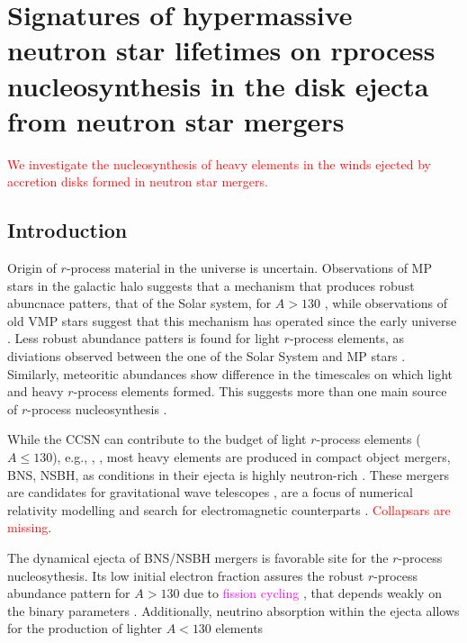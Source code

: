 \documentclass[11pt,a4paper,headinclude=true,DIV=14,BCOR=8mm,chapterprefix,listof=totoc,twoside,openright,abstracton]{scrbook}
\newcommand{\red}[1]{\textcolor{red}{#1}}
\newcommand{\magenta}[1]{\textcolor{magenta}{#1}} %
\begin{document}

\section{Signatures of hypermassive neutron star lifetimes on rprocess nucleosynthesis in the disk ejecta from neutron star mergers}

\red{We investigate the nucleosynthesis of heavy elements in the winds ejected by accretion disks formed in neutron star mergers.}

\subsection{Introduction}

Origin of $r$-process material in the universe is uncertain. Observations of MP stars in the galactic halo suggests that a mechanism that produces robust abuncnace patters, that of the Solar system, for $A>130$ \cite{(e.g., Sneden et al., 2008).}, while observations of old VMP stars suggest that this mechanism has operated since the early universe \cite{(e.g., Cowan et al., 1999; Ji et al., 2016)}. Less robust abundance patters is found for light $r$-process elements, as diviations observed between the one of the Solar System and MP stars \cite{(e.g., Montes et al., 2007).}. Similarly, meteoritic abundances show difference in the timescales on which light and heavy $r$-process elements formed. This suggests more than one main source of $r$-process nucleosynthesis \cite{Wasserburg et al., 1996}.

While the CCSN can contribute to the budget of light $r$-process elements ($A\leq 130$), e.g., \cite{Roberts et al., 2010; Fischer et al., 2010, Hrdepohl et al., 2010}, \cite{Martinez-Pinedo et al., 2012; Wanajo, 2013}, most heavy elements are produced in compact object mergers, BNS, NSBH, as conditions in their ejecta is highly neutron-rich \cite{(Lattimer and Schramm, 1974)}. These mergers are candidates for gravitational wave telescopes \cite{(e.g., LIGO Scientific Collaboration, 2010; IGO Scientific Collaboration et al., 2015)}, are a focus of numerical relativity modelling \cite{(e.g., Lehner and Pretorius, 2014; Paschalidis, 2017)} and search for electromagnetic counterparts \cite{(e.g., Rosswog, 2015; Fernandez and Metzger, 2016; Tanaka, 2016).}. 
\red{Collapsars are missing}.

The dynamical ejecta of BNS/NSBH mergers is favorable site for the $r$-process nucleosythesis. Its low initial electron fraction assures the robust $r$-process abundance pattern for $A>130$ due to \magenta{fission cycling} \cite{(e.g., Goriely et al., 2005),}, that depends weakly on the binary parameters \cite{(e.g., Goriely et al., 2011; Korobkin et al., 2012; Bauswein et al., 2013)}. Additionally, neutrino absorption within the ejecta allows for the production of lighter $A<130$ elements \cite{(e.g., Wanajo et al., 2014; Goriely et al., 2015; Sekiguchi et al., 2015; Radice et al., 2016; Foucart et al., 2016a,b; Roberts et al., 2017)}
\end{document}
